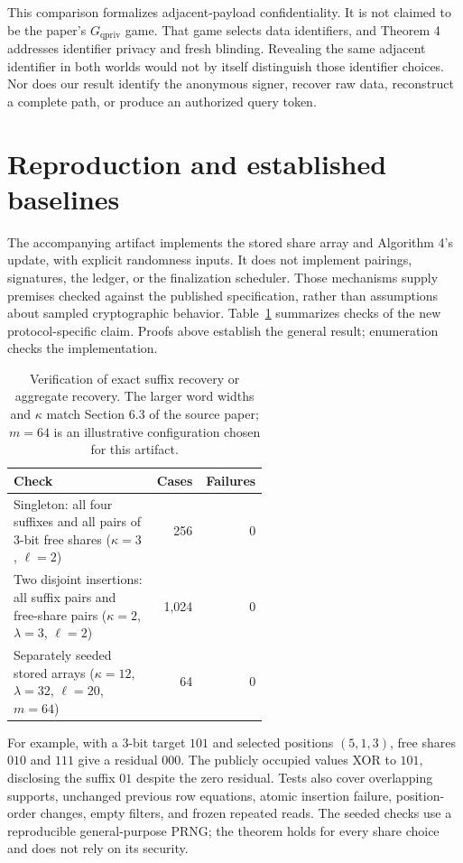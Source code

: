 \documentclass[11pt]{article}
\begin{document}
This comparison formalizes adjacent-payload confidentiality. It is not claimed
to be the paper's $G_{\mathrm{qpriv}}$ game. That game selects data identifiers,
and Theorem 4 addresses identifier privacy and fresh blinding. Revealing the
same adjacent identifier in both worlds would not by itself distinguish those
identifier choices. Nor does our result identify the anonymous signer, recover
raw data, reconstruct a complete path, or produce an authorized query token.

\section{Reproduction and established baselines}

The accompanying artifact implements the stored share array and Algorithm 4's
update, with explicit randomness inputs. It does not implement pairings,
signatures, the ledger, or the finalization scheduler. Those mechanisms supply
premises checked against the published specification, rather than assumptions
about sampled cryptographic behavior. Table~\ref{tab:checks} summarizes checks
of the new protocol-specific claim. Proofs above establish the general result;
enumeration checks the implementation.

\begin{table}[ht]
\centering
\small
\begin{tabular}{p{0.56\linewidth}rr}
\toprule
Check & Cases & Failures\\
\midrule
Singleton: all four suffixes and all pairs of 3-bit free shares
($\kappa=3$, $\ell=2$) & 256 & 0\\
Two disjoint insertions: all suffix pairs and free-share pairs
($\kappa=2$, $\lambda=3$, $\ell=2$) & 1,024 & 0\\
Separately seeded stored arrays ($\kappa=12$, $\lambda=32$,
$\ell=20$, $m=64$) & 64 & 0\\
\bottomrule
\end{tabular}
\caption{Verification of exact suffix recovery or aggregate recovery.
The larger word widths and $\kappa$ match Section 6.3 of the source paper;
$m=64$ is an illustrative configuration chosen for this artifact.}
\label{tab:checks}
\end{table}

For example, with a 3-bit target $101$ and selected positions $(5,1,3)$,
free shares $010$ and $111$ give a residual $000$. The publicly occupied
values XOR to $101$, disclosing the suffix $01$ despite the zero residual.
Tests also cover overlapping supports, unchanged previous row equations,
atomic insertion failure, position-order changes, empty filters, and frozen
repeated reads. The seeded checks use a reproducible general-purpose PRNG;
the theorem holds for every share choice and does not rely on its security.
\end{document}

